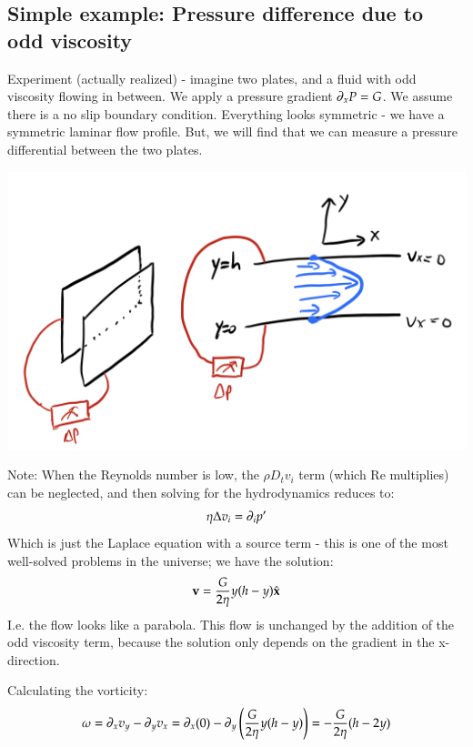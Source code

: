 \subsection{Simple example: Pressure difference due to odd viscosity}
Experiment (actually realized) - imagine two plates, and a fluid with odd viscosity flowing in between. We apply a pressure gradient $\partial_x P = G$. We assume there is a no slip boundary condition. Everything looks symmetric - we have a symmetric laminar flow profile. But, we will find that we can measure a pressure differential between the two plates.

\begin{center}
    \includegraphics[scale=0.35]{Lectures/Images/lec10-pressuredifferential.png}
\end{center}

Note: When the Reynolds number is low, the $\rho D_t v_i$ term (which $\text{Re}$ multiplies) can be neglected, and then solving for the hydrodynamics reduces to:
\begin{equation}
    \eta\Delta v_i = \partial_i p'
\end{equation}
Which is just the Laplace equation with a source term - this is one of the most well-solved problems in the universe; we have the solution:
\begin{equation}
    \mathbf{v} = \frac{G}{2\eta}y(h-y)\hat{\mathbf{x}}
\end{equation}
I.e. the flow looks like a parabola. This flow is unchanged by the addition of the odd viscosity term, because the solution only depends on the gradient in the x-direction.

Calculating the vorticity:
\begin{equation}
    \omega = \partial_x v_y - \partial_y v_x = \partial_x(0) - \partial_y\left(\frac{G}{2\eta}y(h-y)\right) = -\frac{G}{2\eta}(h - 2y)
\end{equation}

